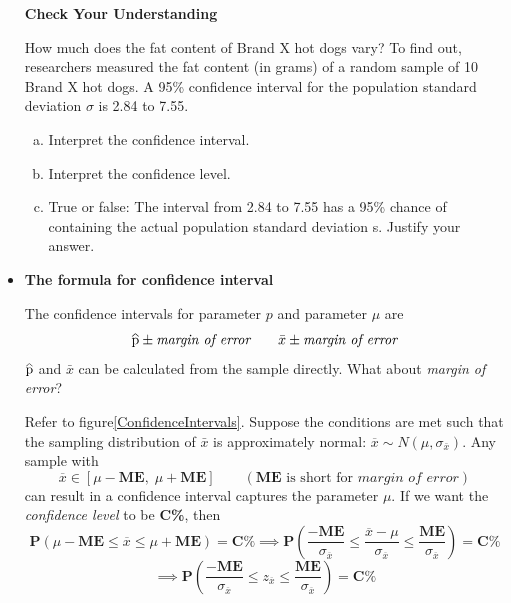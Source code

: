 \documentclass[a4paper, 12pt,twoside]{book}
\newcommand\reallywidehat[1]{%
\savestack{\tmpbox}{\stretchto{%
  \scaleto{%
    \scalerel*[\widthof{\ensuremath{#1}}]{\kern-.6pt\bigwedge\kern-.6pt}%
    {\rule[-\textheight/2]{1ex}{\textheight}}%
  }{\textheight}%
}{0.5ex}}%
\stackon[1pt]{#1}{\tmpbox}%
}
\begin{document}
\begin{itemize}
     \colorbox{champagne}{\parbox{\textwidth}{
     \textbf{Check Your Understanding}\vspace{0.3cm}
     
     How much does the fat content of Brand X hot dogs vary? To find out, researchers measured the fat content (in grams) of a random sample of 10 Brand X hot dogs. A 95\% confidence interval for the population standard deviation $\sigma$ is 2.84 to 7.55.
     \begin{enumerate}[(a)]
         \item Interpret the confidence interval.
         \item Interpret the confidence level.
         \item True or false: The interval from 2.84 to 7.55 has a 95\% chance of containing the actual population standard deviation s. Justify your answer.
     \end{enumerate}
     }}   

      
      
      
      
      
      
     \newpage 
      
      \item \textbf{The formula for confidence interval}\vspace{0.3cm}
      
      The confidence intervals for parameter $p$ and parameter $\mu$ are 
       $$\reallywidehat{p} \pm \textit{margin of error} \qquad \bar{x} \pm \textit{margin of error}$$
       $\reallywidehat{p}$ and $\bar{x}$ can be calculated from the sample directly. What about \textit{margin of error}? \vspace{0.6cm}     
       
       Refer to figure\ref{ConfidenceIntervals}. Suppose the conditions are met such that the sampling distribution of $\bar{x}$ is approximately normal: $\overline{x} \sim N(\mu, \sigma_{\bar{x}})$. Any sample with 
       $$\overline{x} \in [\mu - \textbf{ME},\; \mu + \textbf{ME}]\qquad(\textbf{ME} \text{ is short for} \textit{ margin of error})$$ 
       can result in a confidence interval captures the parameter $\mu$. If we want the \textit{confidence level} to be \textbf{C\%}, then
       $$\textbf{P}(\mu - \textbf{ME}\leq \overline{x} \leq \mu + \textbf{ME}) = \textbf{C\%} \implies \textbf{P}(\frac{-\textbf{ME}}{\sigma_{\overline{x}}}\leq \frac{\overline{x}-\mu}{\sigma_{\overline{x}}} \leq \frac{\textbf{ME}}{\sigma_{\overline{x}}}) = \textbf{C\%}$$
       $$\implies \textbf{P}(\frac{-\textbf{ME}}{\sigma_{\overline{x}}}\leq z_{\overline{x}} \leq \frac{\textbf{ME}}{\sigma_{\overline{x}}}) = \textbf{C\%}$$


\end{itemize}
\end{document}
